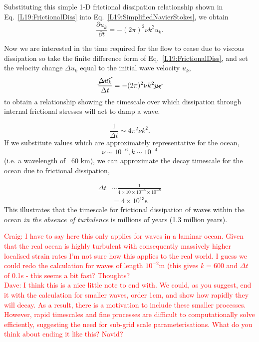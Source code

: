 Substituting this simple 1-D frictional dissipation relationship shown in Eq.~\eqref{L19:FrictionalDiss} into Eq.~\eqref{L19:SimplifiedNavierStokes}, we obtain
\begin{equation}
    \frac{\partial u_k}{\partial t} = -(2\pi)^2\nu k^2 u_k.
\end{equation}

Now we are interested in the time required for the flow to cease due to viscous dissipation so take the finite difference form of Eq.~\eqref{L19:FrictionalDiss}, and set the velocity change $\Delta u_k$ equal to the initial wave velocity $u_k$,
\begin{equation}
    \frac{\cancel{\Delta u_k}}{\Delta t} = -(2\pi)^2\nu k^2 \cancel{u_k}
\end{equation}
to obtain a relationship showing the timescale over which dissipation through internal frictional stresses will act to damp a wave.

\begin{equation}
    \frac{1}{\Delta t} \sim 4\pi^2 \nu k^2.
\end{equation}
If we substitute values which are approximately representative for the ocean, 
\begin{equation}
    \nu \sim 10^{-6}, k \sim 10^{-4}
\end{equation}
(i.e. a wavelength of ~60 km), we can approximate the decay timescale for the ocean due to frictional dissipation,

\begin{align}
    \Delta t &\sim \frac{1}{4\times 10 \times 10^{-6} \times 10^{-8}}\\
    &= 4\times 10^{13} \mathrm{s}
\end{align}
This illustrates that the timescale for frictional dissipation of waves within the ocean \textit{in the absence of turbulence} is millions of years (1.3 million years).

\textcolor{red}{Craig: I have to say here this only applies for waves in a laminar ocean. Given that the real ocean is highly turbulent with consequently massively higher localised strain rates I'm not sure how this applies to the real world. I guess we could redo the calculation for waves of length $10^{-2}$m (this gives $k = 600$ and $\Delta t $ of 0.1s - this seems a bit fast? Thoughts?\\ Dave: I think this is a nice little note to end with. We could, as you suggest, end it with the calculation for smaller waves, order 1cm, and show how rapidly they will decay. As a result, there is a motivation to include these smaller processes. However, rapid timescales and fine processes are difficult to computationally solve efficiently, suggesting the need for sub-grid scale parameterisations. What do you think about ending it like this? Navid?}

